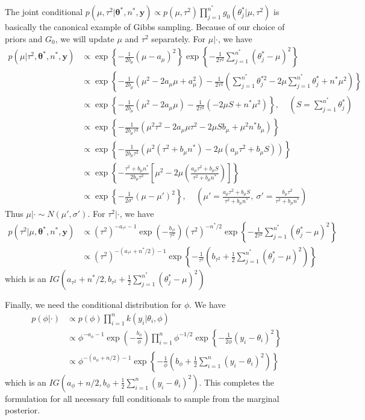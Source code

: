 \documentclass[12pt]{article}
\newcommand{\m}[1]{\mathbf{\bm{#1}}}
\begin{document}
The joint conditional $p(\mu, \tau^2|\m{\theta}^*, n^*, \m{y})\propto p(\mu,\tau^2)\prod_{j=1}^{n^*}g_0(\theta_j^*|\mu, \tau^2)$ is basically the canonical example of Gibbs sampling. Because of our choice of priors and $G_0$, we will update $\mu$ and $\tau^2$ separately. For $\mu|\cdot$, we have
\begin{align*}
p(\mu|\tau^2,\m{\theta}^*, n^*, \m{y}) &\propto \exp\left\{-\frac{1}{2b_\mu}(\mu-a_\mu)^2\right\}\exp\left\{-\frac{1}{2\tau^2}\sum_{j=1}^{n^*}(\theta_j^*-\mu)^2\right\} \\
&\propto \exp\left\{-\frac{1}{2b_\mu}(\mu^2-2a_\mu\mu+a_\mu^2)-\frac{1}{2\tau^2}(\sum_{j=1}^{n^*}\theta_j^{*2}-2\mu\sum_{j=1}^{n^*}\theta_j^*+n^*\mu^2)\right\} \\
&\propto \exp\left\{-\frac{1}{2b_\mu}(\mu^2-2a_\mu\mu)-\frac{1}{2\tau^2}(-2\mu S+n^*\mu^2)\right\},~~~~~(S=\sum_{j=1}^{n^*}\theta_j^*) \\
&\propto \exp\left\{-\frac{1}{2b_\mu\tau^2}(\mu^2\tau^2-2a_\mu\mu\tau^2 - 2\mu Sb_\mu + \mu^2n^*b_\mu)\right\} \\
&\propto \exp\left\{-\frac{1}{2b_\mu\tau^2}(\mu^2(\tau^2+b_\mu n^*) -2\mu(a_\mu\tau^2 + b_\mu S))\right\} \\
&\propto \exp\left\{-\frac{\tau^2+b_\mu n^*}{2b_\mu\tau^2}\left[\mu^2 -2\mu\left(\frac{a_\mu\tau^2 + b_\mu S}{\tau^2+b_\mu n^*}\right)\right]\right\} \\
&\propto \exp\left\{-\frac{1}{2\sigma'}(\mu-\mu')^2\right\},~~~~~(\mu'=\frac{a_\mu\tau^2+b_\mu S}{\tau^2+b_\mu n^*},~\sigma'=\frac{b_\mu\tau^2}{\tau^2+b_\mu n^*})
\end{align*}
Thus $\mu|\cdot \sim N(\mu', \sigma')$. For $\tau^2|\cdot$, we have
\begin{align*}
p(\tau^2|\mu,\m{\theta}^*, n^*, \m{y}) &\propto (\tau^2)^{-a_{\tau^2}-1}\exp\left(-\frac{b_{\tau^2}}{\tau^2}\right)(\tau^2)^{-n^*/2}\exp\left\{-\frac{1}{2\tau^2}\sum_{j=1}^{n^*}(\theta_j^*-\mu)^2\right\} \\
&\propto (\tau^2)^{-(a_{\tau^2}+n^*/2)-1}\exp\left\{-\frac{1}{\tau^2}\left(b_{\tau^2}+\frac{1}{2}\sum_{j=1}^{n^*}(\theta_j^*-\mu)^2\right)\right\}
\end{align*}
which is an $IG(a_{\tau^2}+n^*/2, b_{\tau^2}+\frac{1}{2}\sum_{j=1}^{n^*}(\theta_j^*-\mu)^2)$

Finally, we need the conditional distribution for $\phi$. We have
\begin{align*}
p(\phi|\cdot) &\propto p(\phi)\prod_{i=1}^nk(y_i|\theta_i,\phi) \\
&\propto \phi^{-a_\phi-1}\exp\left(-\frac{b_\phi}{\phi}\right)\prod_{i=1}^n \phi^{-1/2}\exp\left\{-\frac{1}{2\phi}(y_i-\theta_i)^2\right\} \\
&\propto \phi^{-(a_\phi+n/2)-1}\exp\left\{-\frac{1}{\phi}\left(b_\phi+\frac{1}{2}\sum_{i=1}^n(y_i-\theta_i)^2\right)\right\}
\end{align*}
which is an $IG(a_\phi+n/2, b_\phi+\frac{1}{2}\sum_{i=1}^n(y_i-\theta_i)^2)$. This completes the formulation for all necessary full conditionals to sample from the marginal posterior.
\end{document}
